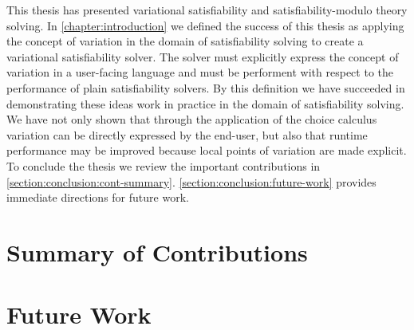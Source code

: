 \label{chapter:conclusion}
%
This thesis has presented variational satisfiability and satisfiability-modulo
theory solving. In \autoref{chapter:introduction} we defined the success of this
thesis as applying the concept of variation in the domain of satisfiability
solving to create a variational satisfiability solver. The solver must
explicitly express the concept of variation in a user-facing language and must
be performent with respect to the performance of plain satisfiability solvers.
By this definition we have succeeded in demonstrating these ideas work in
practice in the domain of satisfiability solving. We have not only shown that
through the application of the choice calculus variation can be directly
expressed by the end-user, but also that runtime performance may be improved
because local points of variation are made explicit.
%
To conclude the thesis we review the important contributions in
\autoref{section:conclusion:cont-summary}.
\autoref{section:conclusion:future-work} provides immediate directions for
future work.

\section{Summary of Contributions}

%
\section{Future Work}

%





